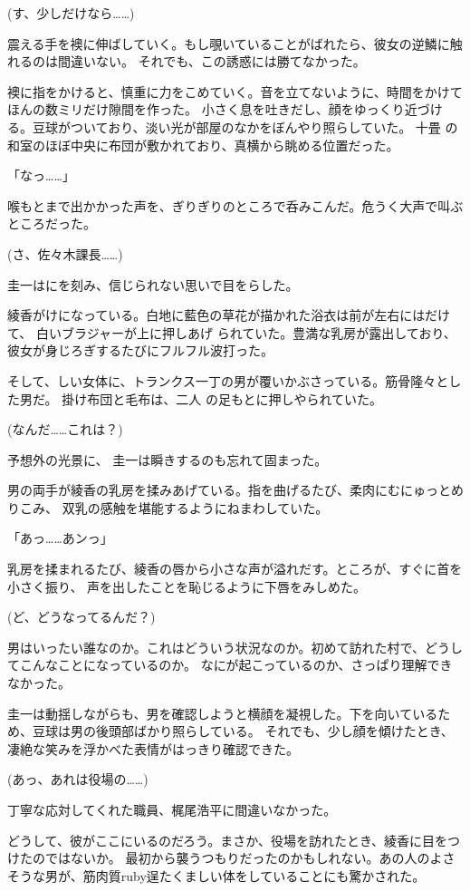 ﻿\documentclass[
    book,tate,
    line_length=30zw,
    jafontsize=12pt,
    paper=b5j,
    landscape,
    ]{jlreq}
\begin{document}
(す、少しだけなら……)

震える手を襖に伸ばしていく。もし覗いていることがばれたら、彼女の逆鱗に触れるのは間違いない。
それでも、この誘惑には勝てなかった。

襖に指をかけると、慎重に力をこめていく。音を立てないように、時間をかけてほんの数ミリだけ隙間を作った。
小さく息を吐きだし、顔をゆっくり近づける。豆球がついており、淡い光が部屋のなかをぼんやり照らしていた。
十畳 の和室のほぼ中央に布団が敷かれており、真横から眺める位置だった。

「なっ……」

喉もとまで出かかった声を、ぎりぎりのところで呑みこんだ。危うく大声で叫ぶところだった。

(さ、佐々木課長……)

圭一はにを刻み、信じられない思いで目をらした。

綾香がけになっている。白地に藍色の草花が描かれた浴衣は前が左右にはだけて、
白いブラジャーが上に押しあげ られていた。豊満な乳房が露出しており、彼女が身じろぎするたびにフルフル波打った。

そして、しい女体に、トランクス一丁の男が覆いかぶさっている。筋骨隆々とした男だ。
掛け布団と毛布は、二人 の足もとに押しやられていた。

(なんだ……これは？)

予想外の光景に、 圭一は瞬きするのも忘れて固まった。

男の両手が綾香の乳房を揉みあげている。指を曲げるたび、柔肉にむにゅっとめりこみ、
双乳の感触を堪能するようにねまわしていた。

「あっ……あンっ」

乳房を揉まれるたび、綾香の唇から小さな声が溢れだす。ところが、すぐに首を小さく振り、
声を出したことを恥じるように下唇をみしめた。

(ど、どうなってるんだ？)

男はいったい誰なのか。これはどういう状況なのか。初めて訪れた村で、どうしてこんなことになっているのか。
なにが起こっているのか、さっぱり理解できなかった。

圭一は動揺しながらも、男を確認しようと横顔を凝視した。下を向いているため、豆球は男の後頭部ばかり照らしている。
それでも、少し顔を傾けたとき、凄絶な笑みを浮かべた表情がはっきり確認できた。

(あっ、あれは役場の……)

丁寧な応対してくれた職員、梶尾浩平に間違いなかった。

どうして、彼がここにいるのだろう。まさか、役場を訪れたとき、綾香に目をつけたのではないか。
最初から襲うつもりだったのかもしれない。あの人のよさそうな男が、筋肉質ruby{逞}{たくま}しい体をしていることにも驚かされた。
\end{document}
